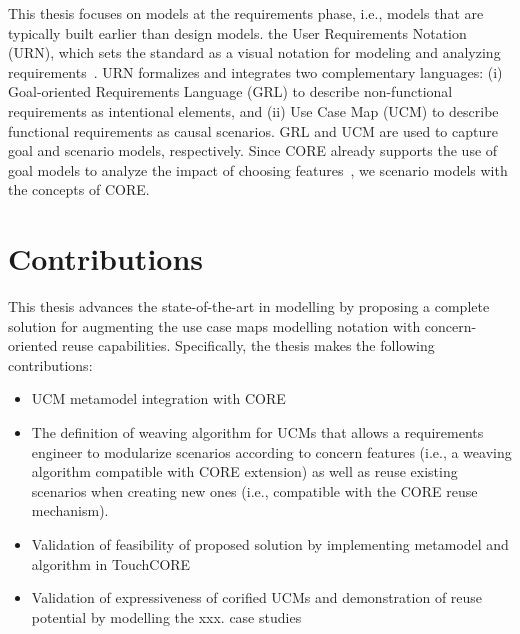 This thesis focuses on  models at the requirements phase, i.e., models that are typically built earlier than design models.  the User Requirements Notation (URN), which sets the standard as a visual notation for modeling and analyzing requirements~\cite{amyot2002urn}. URN formalizes and integrates two complementary languages: (i) Goal-oriented Requirements Language (GRL) to describe non-functional requirements as intentional elements, and (ii) Use Case Map (UCM) to describe functional requirements as causal scenarios. GRL and UCM are used to capture goal and scenario models, respectively. Since CORE already supports the use of goal models to analyze the impact of choosing features~\cite{alam2013concern}, we  scenario models  with the concepts of CORE.

 

\section{Contributions}

This thesis advances the state-of-the-art in modelling by proposing a complete solution for augmenting the use case maps modelling notation with concern-oriented reuse capabilities. Specifically, the thesis makes the following contributions:


\begin{itemize}

\item UCM metamodel integration with CORE

\item The definition of weaving algorithm for UCMs that allows a requirements engineer to modularize scenarios according to concern features (i.e., a weaving algorithm compatible with CORE extension) as well as reuse existing scenarios when creating new ones (i.e., compatible with the CORE reuse mechanism).

\item Validation of feasibility of proposed solution by implementing metamodel and algorithm in TouchCORE

\item Validation of expressiveness of corified UCMs and demonstration of reuse potential by modelling the  xxx. case studies

\end{itemize}

